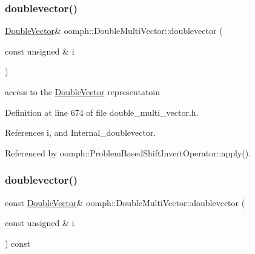 \mbox{\label{classoomph_1_1DoubleMultiVector_a9ec00020512cc85190a754332ed00cb7}} 
\subsubsection{\texorpdfstring{doublevector()}{doublevector()}\hspace{0.1cm}{\footnotesize\ttfamily [1/2]}}
{\footnotesize\ttfamily \hyperlink{classoomph_1_1DoubleVector}{Double\+Vector}\& oomph\+::\+Double\+Multi\+Vector\+::doublevector (\begin{DoxyParamCaption}\item[{const unsigned \&}]{i }\end{DoxyParamCaption})\hspace{0.3cm}{\ttfamily [inline]}}



access to the \hyperlink{classoomph_1_1DoubleVector}{Double\+Vector} representatoin 



Definition at line 674 of file double\+\_\+multi\+\_\+vector.\+h.



References i, and Internal\+\_\+doublevector.



Referenced by oomph\+::\+Problem\+Based\+Shift\+Invert\+Operator\+::apply().

\mbox{\label{classoomph_1_1DoubleMultiVector_acac28efef0b5f55c715d1893a5dca3d5}} 
\subsubsection{\texorpdfstring{doublevector()}{doublevector()}\hspace{0.1cm}{\footnotesize\ttfamily [2/2]}}
{\footnotesize\ttfamily const \hyperlink{classoomph_1_1DoubleVector}{Double\+Vector}\& oomph\+::\+Double\+Multi\+Vector\+::doublevector (\begin{DoxyParamCaption}\item[{const unsigned \&}]{i }\end{DoxyParamCaption}) const\hspace{0.3cm}{\ttfamily [inline]}}



